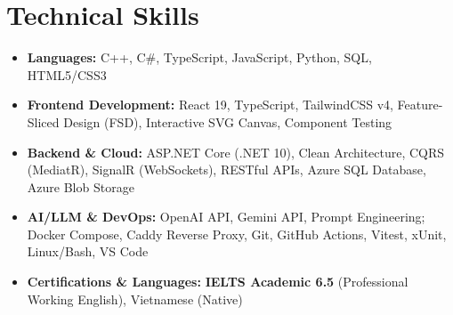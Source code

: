 \documentclass[11pt,a4paper]{article}
\begin{document}
\section*{Technical Skills}
\begin{itemize}[leftmargin=0em, label={}, itemsep=1.8pt]
    \item \textbf{Languages:} C++, C\#, TypeScript, JavaScript, Python, SQL, HTML5/CSS3
    \item \textbf{Frontend Development:} React 19, TypeScript, TailwindCSS v4, Feature-Sliced Design (FSD), Interactive SVG Canvas, Component Testing
    \item \textbf{Backend \& Cloud:} ASP.NET Core (.NET 10), Clean Architecture, CQRS (MediatR), SignalR (WebSockets), RESTful APIs, Azure SQL Database, Azure Blob Storage
    \item \textbf{AI/LLM \& DevOps:} OpenAI API, Gemini API, Prompt Engineering; Docker Compose, Caddy Reverse Proxy, Git, GitHub Actions, Vitest, xUnit, Linux/Bash, VS Code
    \item \textbf{Certifications \& Languages:} \textbf{IELTS Academic 6.5} (Professional Working English), Vietnamese (Native)
\end{itemize}

\vspace{1pt}

\end{document}
